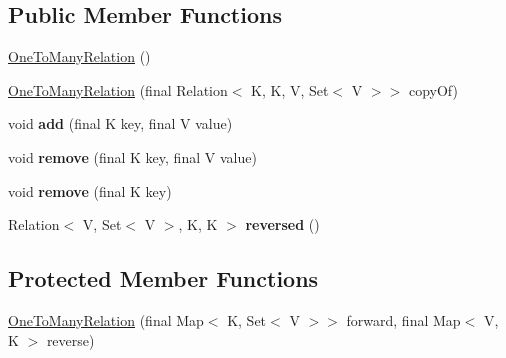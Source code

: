 \subsection*{Public Member Functions}
\begin{DoxyCompactItemize}
\item 
\hyperlink{classosd_1_1util_1_1relation_1_1_one_to_many_relation_3_01_k_00_01_v_01_4_ad85829fb137cb591ba07ff457918ecf2}{One\-To\-Many\-Relation} ()
\item 
\hyperlink{classosd_1_1util_1_1relation_1_1_one_to_many_relation_3_01_k_00_01_v_01_4_a9d73910df0fb6d24550316697fc4e47f}{One\-To\-Many\-Relation} (final Relation$<$ K, K, V, Set$<$ V $>$$>$ copy\-Of)
\item 
\hypertarget{classosd_1_1util_1_1relation_1_1_one_to_many_relation_3_01_k_00_01_v_01_4_a2cd287dedc12f05413334f50bcb4b9e1}{void {\bfseries add} (final K key, final V value)}\label{classosd_1_1util_1_1relation_1_1_one_to_many_relation_3_01_k_00_01_v_01_4_a2cd287dedc12f05413334f50bcb4b9e1}

\item 
\hypertarget{classosd_1_1util_1_1relation_1_1_one_to_many_relation_3_01_k_00_01_v_01_4_a23b9659f96a67b9a82acbe48d69dc0c5}{void {\bfseries remove} (final K key, final V value)}\label{classosd_1_1util_1_1relation_1_1_one_to_many_relation_3_01_k_00_01_v_01_4_a23b9659f96a67b9a82acbe48d69dc0c5}

\item 
\hypertarget{classosd_1_1util_1_1relation_1_1_one_to_many_relation_3_01_k_00_01_v_01_4_a3d817583e1123be6af8040d531eb13b5}{void {\bfseries remove} (final K key)}\label{classosd_1_1util_1_1relation_1_1_one_to_many_relation_3_01_k_00_01_v_01_4_a3d817583e1123be6af8040d531eb13b5}

\item 
\hypertarget{classosd_1_1util_1_1relation_1_1_one_to_many_relation_3_01_k_00_01_v_01_4_a3e74cebee1977d8f31e0760c074f6299}{Relation$<$ V, Set$<$ V $>$, K, K $>$ {\bfseries reversed} ()}\label{classosd_1_1util_1_1relation_1_1_one_to_many_relation_3_01_k_00_01_v_01_4_a3e74cebee1977d8f31e0760c074f6299}

\end{DoxyCompactItemize}
\subsection*{Protected Member Functions}
\begin{DoxyCompactItemize}
\item 
\hyperlink{classosd_1_1util_1_1relation_1_1_one_to_many_relation_3_01_k_00_01_v_01_4_a80cc67fa6eb42a2b27b9b65ddac3150f}{One\-To\-Many\-Relation} (final Map$<$ K, Set$<$ V $>$$>$ forward, final Map$<$ V, K $>$ reverse)
\end{DoxyCompactItemize}


